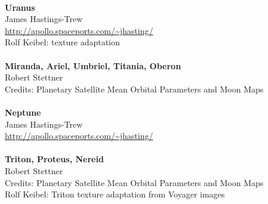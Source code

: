 \documentclass[Orbiter User Manual.tex]{subfiles}
\begin{document}
\\
\textbf{Uranus}\\
James Hastings-Trew\\
\url{http://apollo.spaceports.com/~jhasting/}\\
Rolf Keibel: texture adaptation\\
\\
\textbf{Miranda, Ariel, Umbriel, Titania, Oberon}\\
Robert Stettner\\
Credits: Planetary Satellite Mean Orbital Parameters and Moon Maps\\
\\
\textbf{Neptune}\\
James Hastings-Trew\\
\url{http://apollo.spaceports.com/~jhasting/}\\
\\
\textbf{Triton, Proteus, Nereid}\\
Robert Stettner\\
Credits: Planetary Satellite Mean Orbital Parameters and Moon Maps\\
Rolf Keibel: Triton texture adaptation from Voyager images
\end{document}
